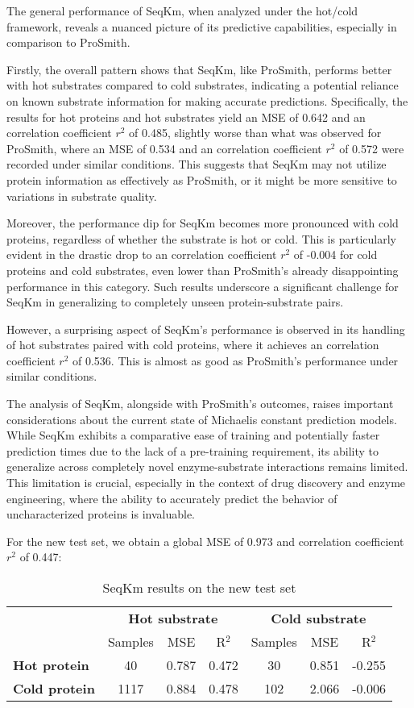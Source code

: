  The general performance of SeqKm, when analyzed under the hot/cold framework, reveals a nuanced picture of its predictive capabilities, especially in comparison to ProSmith.

 Firstly, the overall pattern shows that SeqKm, like ProSmith, performs better with hot substrates compared to cold substrates, indicating a potential reliance on known substrate information for making accurate predictions. Specifically, the results for hot proteins and hot substrates yield an MSE of 0.642 and an correlation coefficient $r^2$ of 0.485, slightly worse than what was observed for ProSmith, where an MSE of 0.534 and an correlation coefficient $r^2$ of 0.572 were recorded under similar conditions. This suggests that SeqKm may not utilize protein information as effectively as ProSmith, or it might be more sensitive to variations in substrate quality.
 
 Moreover, the performance dip for SeqKm becomes more pronounced with cold proteins, regardless of whether the substrate is hot or cold. This is particularly evident in the drastic drop to an correlation coefficient $r^2$ of -0.004 for cold proteins and cold substrates, even lower than ProSmith's already disappointing performance in this category. Such results underscore a significant challenge for SeqKm in generalizing to completely unseen protein-substrate pairs.
 
 However, a surprising aspect of SeqKm's performance is observed in its handling of hot substrates paired with cold proteins, where it achieves an correlation coefficient $r^2$ of 0.536. This is almost as good as ProSmith's performance under similar conditions.
 
 The analysis of SeqKm, alongside with ProSmith's outcomes, raises important considerations about the current state of Michaelis constant prediction models. While SeqKm exhibits a comparative ease of training and potentially faster prediction times due to the lack of a pre-training requirement, its ability to generalize across completely novel enzyme-substrate interactions remains limited. This limitation is crucial, especially in the context of drug discovery and enzyme engineering, where the ability to accurately predict the behavior of uncharacterized proteins is invaluable.

For the new test set, we obtain a global MSE of 0.973 and correlation coefficient $r^2$ of 0.447:

\begin{table}[ht]
  \centering
  \begin{tabular}{lcccccc}
  \hline
   & \multicolumn{3}{c}{\textbf{Hot substrate}} & \multicolumn{3}{c}{\textbf{Cold substrate}} \\
   & Samples & MSE & R\(^2\) & Samples & MSE & R\(^2\) \\ \hline
  \textbf{Hot protein} & 40 & 0.787 & 0.472 & 30 & 0.851 & -0.255 \\
  \textbf{Cold protein} & 1117 & 0.884 & 0.478 & 102 & 2.066 & -0.006 \\ \hline
  \end{tabular}
  \caption{SeqKm results on the new test set}
  \label{tab:updated_summary_performance}
\end{table}

